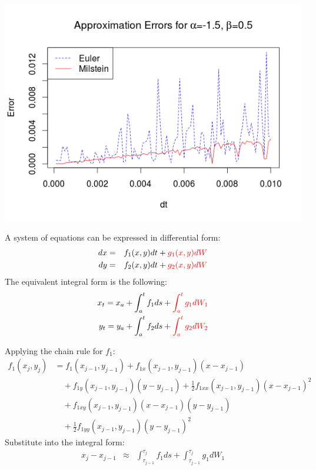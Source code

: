\begin{frame}
	\begin{center}
	\includegraphics[scale=0.55]{alpham15_beta05.png} 
	\end{center}
\end{frame}

\begin{frame}
A system of equations can be expressed in differential form:
	\begin{eqnarray*}
		dx&=&f_1(x,y)dt+{\color{red}g_1(x,y)dW}\\
		dy&=&f_2(x,y)dt+{\color{red}g_2(x,y)dW}\\
	\end{eqnarray*}
The equivalent integral form is the following:
	\begin{eqnarray*}
		x_t=x_a+\int_{a}^{t}f_1 ds+{\color{red}\int_{a}^{t}g_1dW_1}\\
		y_t=y_a+\int_{a}^{t}f_2 ds+{\color{red}\int_{a}^{t}g_2dW_2}\\
	\end{eqnarray*}	
\end{frame}


\begin{frame}
Applying the chain rule for $f_1$:
	\begin{equation*}
	\begin{split}
	f_1(x_j,y_j) &=f_1(x_{j-1},y_{j-1})+f_{1x}(x_{j-1},y_{j-1})(x-x_{j-1})\\
	& \quad +f_{1y}(x_{j-1},y_{j-1})(y-y_{j-1})+\frac{1}{2} f_{1xx}(x_{j-1},y_{j-1})(x-
	x_{j-1})^2\\
	& \quad +f_{1xy}(x_{j-1},y_{j-1})(x-x_{j-1})(y-y_{j-1})\\
	& \quad +\frac{1}{2}f_{1yy}(x_{j-1},y_{j-1})(y-y_{j-1})^2
	\end{split}
	\end{equation*}
Substitute into the integral form:
	\begin{eqnarray*}
	x_j-x_{j-1} & \approx & \int_{\tau_{j-1}}^{\tau_{j}}f_1 ds+\int_{\tau_{j-1}}^{\tau_{j}}g_1dW_1
	\end{eqnarray*}
\end{frame}


